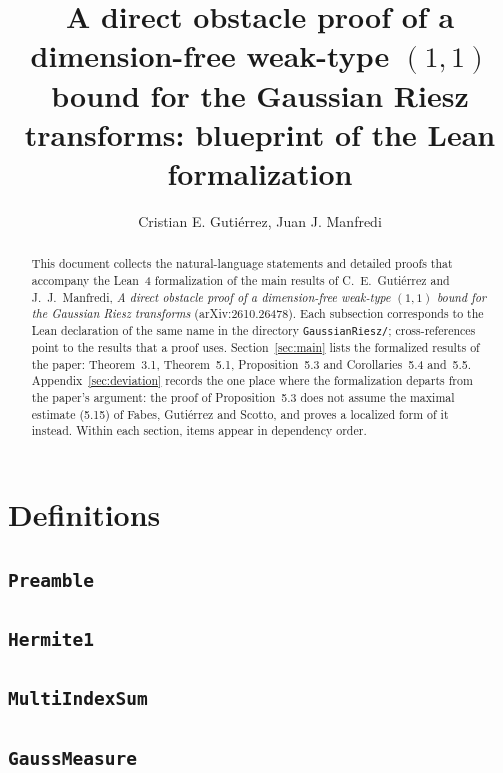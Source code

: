 \documentclass[11pt]{amsart}
\title[Blueprint of the Lean formalization]{A direct obstacle proof of a dimension-free weak-type $(1,1)$ bound for the Gaussian Riesz transforms: blueprint of the Lean formalization}
\author{Cristian E. Guti\'errez, Juan J. Manfredi}
\theoremstyle{definition}
\begin{document}
\begin{abstract}
This document collects the natural-language statements and detailed proofs that accompany the Lean~4 formalization of the main results of C.~E.~Guti\'errez and J.~J.~Manfredi, \emph{A direct obstacle proof of a dimension-free weak-type $(1,1)$ bound for the Gaussian Riesz transforms} (arXiv:2610.26478).
Each subsection corresponds to the Lean declaration of the same name in the directory \texttt{GaussianRiesz/}; cross-references point to the results that a proof uses.
Section~\ref{sec:main} lists the formalized results of the paper: Theorem~3.1, Theorem~5.1, Proposition~5.3 and Corollaries~5.4 and~5.5.
Appendix~\ref{sec:deviation} records the one place where the formalization departs from the paper's argument: the proof of Proposition~5.3 does not assume the maximal estimate (5.15) of Fabes, Guti\'errez and Scotto, and proves a localized form of it instead.
Within each section, items appear in dependency order.
\end{abstract}
\maketitle
\tableofcontents

\section{Definitions}
\subsection{\texorpdfstring{\texttt{Preamble}}{Preamble}}\label{node:Preamble}


\subsection{\texorpdfstring{\texttt{Hermite1}}{Hermite1}}\label{node:Hermite1}


\subsection{\texorpdfstring{\texttt{MultiIndexSum}}{MultiIndexSum}}\label{node:MultiIndexSum}


\subsection{\texorpdfstring{\texttt{GaussMeasure}}{GaussMeasure}}\label{node:GaussMeasure}

\end{document}
